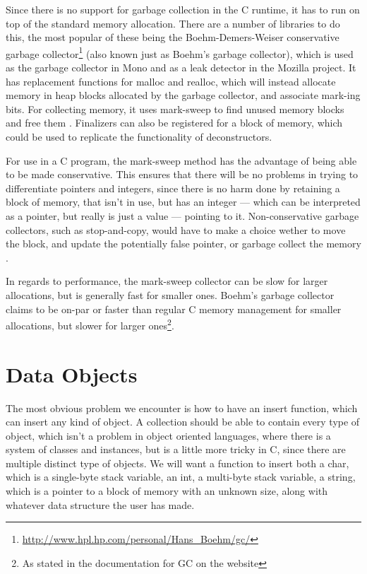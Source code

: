 \documentclass[table]{ituthesis}
\begin{document}
Since there is no support for garbage collection in the C runtime, it has to run on top of the standard memory allocation. There are a number of libraries to do this, the most popular of these being the Boehm-Demers-Weiser conservative garbage collector\footnote{\url{http://www.hpl.hp.com/personal/Hans_Boehm/gc/}} (also known just as Boehm's garbage collector), which is used as the garbage collector in Mono and as a leak detector in the Mozilla project. It has replacement functions for malloc and realloc, which will instead allocate memory in heap blocks allocated by the garbage collector, and associate mark-ing bits. For collecting memory, it uses mark-sweep to find unused memory blocks and free them \cite[chap. 10]{Sestoft2012}. Finalizers can also be registered for a block of memory, which could be used to replicate the functionality of deconstructors.

For use in a C program, the mark-sweep method has the advantage of being able to be made conservative. This ensures that there will be no problems in trying to differentiate pointers and integers, since there is no harm done by retaining a block of memory, that isn't in use, but has an integer — which can be interpreted as a pointer, but really is just a value — pointing to it. Non-conservative garbage collectors, such as stop-and-copy, would have to make a choice wether to move the block, and update the potentially false pointer, or garbage collect the memory \cite[chap. 10]{Sestoft2012}.

In regards to performance, the mark-sweep collector can be slow for larger allocations, but is generally fast for smaller ones. Boehm's garbage collector claims to be on-par or faster than regular C memory management for smaller allocations, but slower for larger ones\footnote{As stated in the documentation for GC on the website}.

\section{Data Objects}\label{sec:arch_data_objects}

The most obvious problem we encounter is how to have an insert function, which can insert any kind of object. A collection should be able to contain every type of object, which isn't a problem in object oriented languages, where there is a system of classes and instances, but is a little more tricky in C, since there are multiple distinct type of objects. We will want a function to insert both a char, which is a single-byte stack variable, an int, a multi-byte stack variable, a string, which is a pointer to a block of memory with an unknown size, along with whatever data structure the user has made.
\end{document}
